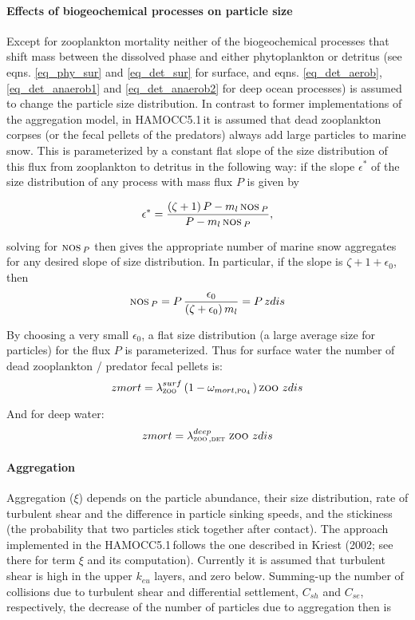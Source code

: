 \documentclass[11pt,a4paper,fleqn,twoside]{article}
\def\pho{\text{\textsc{po$_4$}}\,}
\def\zoo{\text{\textsc{zoo}}\,}
\def\det{\text{\textsc{det}}\,}
\def\nos{\text{\textsc{nos}}\,}
\newcommand{\ham}{HAMOCC5.1\,}
\begin{document}
\paragraph{Effects of biogeochemical processes  on particle size} Except for
zooplankton mortality neither of the biogeochemical processes that shift mass
between the dissolved phase and either phytoplankton or detritus (see eqns.
\ref{eq_phy_sur} and \ref{eq_det_sur} for surface, and eqns.
\ref{eq_det_aerob}, \ref{eq_det_anaerob1} and \ref{eq_det_anaerob2} for deep
ocean processes)  is assumed to change the particle size distribution.  
In contrast to former implementations  of the aggregation
model, in \ham it is assumed that dead zooplankton corpses (or the fecal
pellets of the predators) always add large particles to marine snow. This is
parameterized by a constant flat slope of the size distribution of this flux
from zooplankton to detritus in the following way: if the slope $\epsilon^*$ of
the size distribution of any process with mass flux $P$ is given by

\begin{equation}
\epsilon^* = \frac {(\zeta + 1) \, P - m_l \, \nos_P}{ P - m_l \, \nos_P},
\end{equation}

solving for  $\nos_P$ then gives the appropriate number of marine snow aggregates for any
desired slope of size distribution. In particular, if the slope is 
$\zeta + 1 + \epsilon_0$, then
\begin{equation}
\nos_P = P \, \frac {\epsilon_0}{ (\zeta+\epsilon_0)\, m_l}
= P \, zdis
\end{equation}

By choosing a very small $\epsilon_0$, a flat size distribution (a large
average size for particles) for the flux $P$ is parameterized. Thus for surface
water the number of dead zooplankton / predator fecal pellets is:
\begin{equation}
zmort =  \lambda_{\zoo}^{surf} \, (1-\omega_{mort,\pho}) \, \zoo \, zdis
\end{equation}

And for deep water:
\begin{equation}
zmort =  \lambda_{\zoo,\det}^{deep} \, \zoo \, zdis
\end{equation}

\paragraph{Aggregation} Aggregation ($\xi$) depends on the particle abundance,
their size distribution, rate of turbulent shear and the difference in particle
sinking speeds, and the stickiness (the probability that two particles  stick
together after contact). The approach implemented in the \ham follows the one
described in Kriest (2002; see there for term $\xi$ and its computation).
Currently it is assumed that turbulent shear is high in the upper $k_{eu}$ layers, and
zero below. Summing-up the number of collisions due to turbulent shear and differential
settlement, $C_{sh}$ and $C_{se}$, respectively, the decrease of the number of particles due to
aggregation then is
\end{document}
